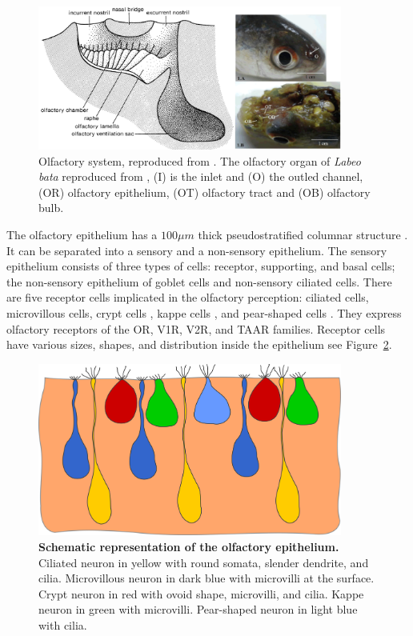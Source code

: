     \begin{figure}[h]
      \centering
      \includegraphics[width=10cm]{part_2/assets/olfactory_schematic.png}
      \caption{Olfactory system, reproduced from \cite{hara2012fish}. The olfactory organ of \textit{Labeo bata} reproduced from \cite{samajdar2016histological}, (I) is the inlet and (O) the outled channel, (OR) olfactory epithelium, (OT) olfactory tract and (OB) olfactory bulb.}
      \label{olfactory_schematic}
    \end{figure}


    The olfactory epithelium has a $100\mu m$ thick pseudostratified columnar structure \cite{hara2012fish}. It can be separated into a sensory and a non-sensory epithelium. The sensory epithelium consists of three types of cells: receptor, supporting, and basal cells; the non-sensory epithelium of goblet cells and non-sensory ciliated cells. There are five receptor cells implicated in the olfactory perception: ciliated cells, microvillous cells, crypt cells \cite{ichikawa1977fine,hansen2005diversity}, kappe cells \cite{ahuja2014kappe}, and pear-shaped cells \cite{wakisaka2017adenosine}. They express olfactory receptors of the OR, V1R, V2R, and TAAR families. Receptor cells have various sizes, shapes, and distribution inside the epithelium see Figure~\ref{olfactory_schematic_full}.

    \begin{figure}[h]
      \centering
      \includegraphics[width=10cm]{part_2/assets/olfactory_schematic_full.png}
      \caption{{\bf Schematic representation of the olfactory epithelium.} Ciliated neuron in yellow with round somata, slender dendrite, and cilia. Microvillous neuron in dark blue with microvilli at the surface. Crypt neuron in red with ovoid shape, microvilli, and cilia. Kappe neuron in green with microvilli. Pear-shaped neuron in light blue with cilia.}
      \label{olfactory_schematic_full}
    \end{figure}

